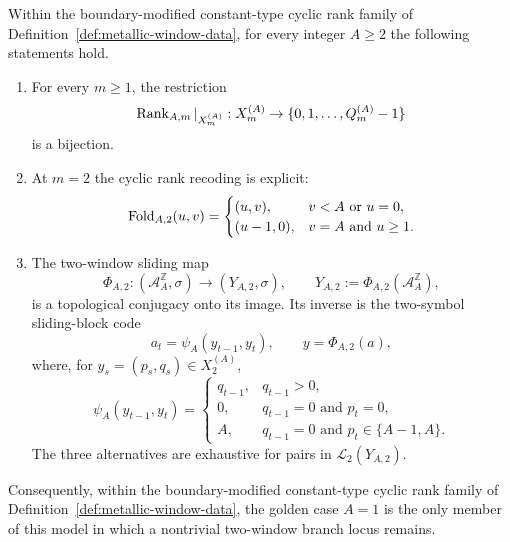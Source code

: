 \begin{theorem}
\label{thm:metallic-two-window-rigidity}
Within the boundary-modified constant-type cyclic rank family of
Definition~\ref{def:metallic-window-data}, for every integer $A\ge 2$ the
following statements hold.
\begin{enumerate}[label=(\roman*),leftmargin=*,itemsep=2pt]
  \item For every $m\ge 1$, the restriction
  \[
  \operatorname{Rank}_{A,m}|_{X_m^{(A)}}:X_m^{(A)}\to
  \{0,1,\ldots,Q_m^{(A)}-1\}
  \]
  is a bijection.
  \item At $m=2$ the cyclic rank recoding is explicit:
  \[
  \mathrm{Fold}_{A,2}(u,v)=
  \begin{cases}
  (u,v), & v<A\text{ or }u=0,\\
  (u-1,0), & v=A\text{ and }u\ge 1.
  \end{cases}
  \]
  \item The two-window sliding map
  \[
  \Phi_{A,2}:(\mathcal A_A^{\mathbb Z},\sigma)\to
  (Y_{A,2},\sigma),
  \qquad
  Y_{A,2}:=\Phi_{A,2}(\mathcal A_A^{\mathbb Z}),
  \]
  is a topological conjugacy onto its image.  Its inverse is the
  two-symbol sliding-block code
  \[
  a_t=\psi_A(y_{t-1},y_t),\qquad y=\Phi_{A,2}(a),
  \]
  where, for $y_s=(p_s,q_s)\in X_2^{(A)}$,
  \[
  \psi_A(y_{t-1},y_t)=
  \begin{cases}
  q_{t-1}, & q_{t-1}>0,\\
  0, & q_{t-1}=0\text{ and }p_t=0,\\
  A, & q_{t-1}=0\text{ and }p_t\in\{A-1,A\}.
  \end{cases}
  \]
  The three alternatives are exhaustive for pairs in $\mathcal L_2(Y_{A,2})$.
\end{enumerate}
Consequently, within the boundary-modified constant-type cyclic rank family
of Definition~\ref{def:metallic-window-data}, the golden case $A=1$ is
the only member of this model in which a nontrivial two-window branch locus
remains.
\end{theorem}

